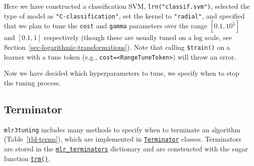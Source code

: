 Here we have constructed a classification SVM,
\texttt{lrn("classif.svm")}, selected the type of model as
\texttt{"C-classification"}, set the kernel to \texttt{"radial"}, and
specified that we plan to tune the \texttt{cost} and \texttt{gamma}
parameters over the range \([0.1, 10^5]\) and \([0.1, 1]\) respectively
(though these are usually tuned on a log scale, see
Section~\ref{sec-logarithmic-transformations}). Note that calling
\texttt{\$train()} on a learner with a tune token (e.g.,
\texttt{cost=\textless{}RangeTuneToken\textgreater{}}) will throw an
error.

Now we have decided which hyperparameters to tune, we specify when to
stop the tuning process.

\hypertarget{sec-terminator}{%
\subsection{Terminator}\label{sec-terminator}}

\texttt{mlr3tuning} includes many methods to specify when to terminate
an algorithm (Table~\ref{tbl-terms}), which are implemented in
\href{https://bbotk.mlr-org.com/reference/Terminator.html}{\texttt{Terminator}}
classes. Terminators are stored in the
\href{https://bbotk.mlr-org.com/reference/mlr_terminators.html}{\texttt{mlr\_terminators}}
dictionary and are constructed with the sugar function
\href{https://bbotk.mlr-org.com/reference/trm.html}{\texttt{trm()}}.

